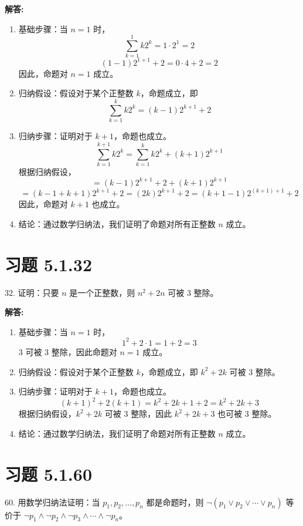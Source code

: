 \documentclass[UTF8]{report}
\theoremstyle{MyLineTheoremStyle} %
\theoremstyle{MyBlockTheoremStyle} %
\theoremstyle{MySubsubsectionStyle} %
\begin{document}
\textbf{解答:}
\begin{enumerate}
    \item 基础步骤：当 $n=1$ 时，
    \[
    \sum_{k=1}^{1} k 2^k = 1 \cdot 2^1 = 2
    \]
    \[
    (1-1) 2^{1+1} + 2 = 0 \cdot 4 + 2 = 2
    \]
    因此，命题对 $n=1$ 成立。
    \item 归纳假设：假设对于某个正整数 $k$，命题成立，即
    \[
    \sum_{k=1}^{k} k 2^k = (k-1) 2^{k+1} + 2
    \]
    \item 归纳步骤：证明对于 $k+1$，命题也成立。
    \[
    \sum_{k=1}^{k+1} k 2^k = \sum_{k=1}^{k} k 2^k + (k+1) 2^{k+1}
    \]
    根据归纳假设，
    \[
    = (k-1) 2^{k+1} + 2 + (k+1) 2^{k+1}
    \]
    \[
    = (k-1+ k+1) 2^{k+1} + 2 = (2k) 2^{k+1} + 2 = (k+1-1) 2^{(k+1)+1} + 2
    \]
    因此，命题对 $k+1$ 也成立。
    \item 结论：通过数学归纳法，我们证明了命题对所有正整数 $n$ 成立。
\end{enumerate}

\section{习题 5.1.32}
32. 证明：只要 $n$ 是一个正整数，则 $n^2 + 2n$ 可被 3 整除。

\textbf{解答:}
\begin{enumerate}
    \item 基础步骤：当 $n=1$ 时，
    \[
    1^2 + 2 \cdot 1 = 1 + 2 = 3
    \]
    3 可被 3 整除，因此命题对 $n=1$ 成立。
    \item 归纳假设：假设对于某个正整数 $k$，命题成立，即 $k^2 + 2k$ 可被 3 整除。
    \item 归纳步骤：证明对于 $k+1$，命题也成立。
    \[
    (k+1)^2 + 2(k+1) = k^2 + 2k + 1 + 2 = k^2 + 2k + 3
    \]
    根据归纳假设，$k^2 + 2k$ 可被 3 整除，因此 $k^2 + 2k + 3$ 也可被 3 整除。
    \item 结论：通过数学归纳法，我们证明了命题对所有正整数 $n$ 成立。
\end{enumerate}

\section{习题 5.1.60}
60. 用数学归纳法证明：当 $p_1, p_2, \ldots, p_n$ 都是命题时，则 $\neg(p_1 \vee p_2 \vee \cdots \vee p_n)$ 等价于 $\neg p_1 \wedge \neg p_2 \wedge \neg p_3 \wedge \cdots \wedge \neg p_n$。
\end{document}
